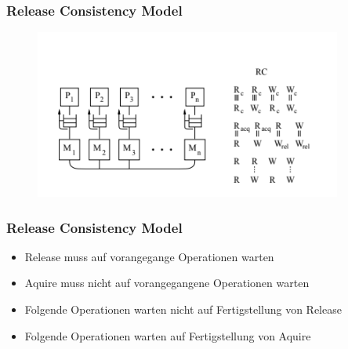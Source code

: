 \documentclass{sikslides}
\begin{document}
\begin{frame}
	\frametitle{Release Consistency Model}
\begin{figure}[htbp] 
  \centering
  \includegraphics[width=0.9\textwidth]{figures/rc.png}
  \label{Fig:weak}
\end{figure}

\end{frame}



\begin{frame}
	\frametitle{Release Consistency Model}
	\begin{itemize}

		\item Release muss auf vorangegange Operationen warten \bigskip
		\item Aquire muss nicht auf vorangegangene Operationen warten \bigskip
		\item Folgende Operationen warten  nicht auf Fertigstellung von Release \bigskip
		\item Folgende Operationen warten auf Fertigstellung von Aquire \bigskip
	\end{itemize}
\end{frame}
\end{document}
